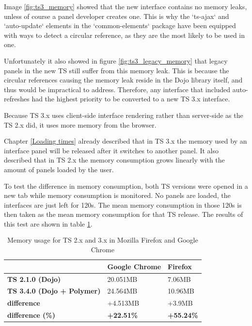 Image \ref{fig:ts3_memory} showed that the new interface contains no memory leaks,
unless of course a panel developer creates one. This is why the `ts-ajax` and
`auto-update` elements in the `common-elements` package have been equipped with
ways to detect a circular reference, as they are the most likely to be used in one.

Unfortunately it also showed in figure \ref{fig:ts3_legacy_memory} that legacy
panels in the new TS still suffer from this memory leak. This is because the
circular references causing the memory leak reside in the Dojo library itself,
and thus would be impractical to address.
Therefore, any interface that included auto-refreshes had the highest priority
to be converted to a new TS 3.x interface.

Because TS 3.x uses client-side interface rendering rather than server-side as
the TS 2.x did, it uses more memory from the browser.

Chapter \ref{Loading times} already described that in TS 3.x the memory used
by an interface panel will be released after it switches to another panel.
It also described that in TS 2.x the memory consumption grows linearly with the
amount of panels loaded by the user.

To test the difference in memory consumption, both TS versions were opened in
a new tab while memory consumption is monitored. No panels are loaded, the
interfaces are just left for 120s. The mean memory consumption in those 120s is
then taken as the mean memory consumption for that TS release.
The results of this test are shown in table \ref{tbl:memoryusage}.

\begin{table}
  \begin{center}
    \begin{tabular}{| l | l | l |}
    \hline
     & Google Chrome & Firefox \\ \hline
    \textbf{TS 2.1.0 (Dojo)} & 20.051MB & 7.06MB \\ \hline
    \textbf{TS 3.4.0 (Dojo + Polymer)} & 24.564MB & 10.96MB \\ \hline
    \textbf{difference} & +4.513MB & +3.9MB \\ \hline
    \textbf{difference (\%)} & \textbf{+22.51\%} & \textbf{+55.24\%} \\ \hline
    \end{tabular}
  \end{center}
  \caption{Memory usage for TS 2.x and 3.x in Mozilla Firefox and Google Chrome}
  \label{tbl:memoryusage}
\end{table}

